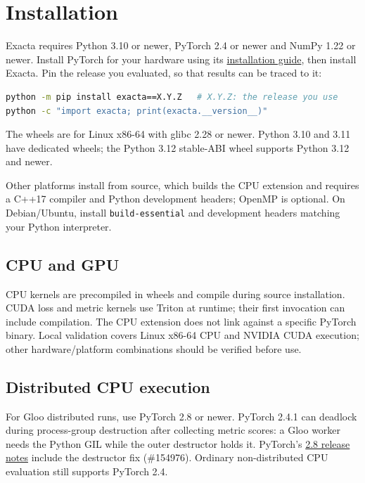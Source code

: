 \chapter{Installation}\label{ch:installation}

Exacta requires Python 3.10 or newer, PyTorch 2.4 or newer and NumPy 1.22 or newer.
Install PyTorch for your hardware using its \href{https://pytorch.org/get-started/locally/}{installation guide},
then install Exacta. Pin the release you evaluated, so that results can be traced to it:

\begin{lstlisting}[language=bash]
python -m pip install exacta==X.Y.Z   # X.Y.Z: the release you use
python -c "import exacta; print(exacta.__version__)"
\end{lstlisting}

The wheels are for Linux x86-64 with glibc 2.28 or newer. Python 3.10 and 3.11
have dedicated wheels; the Python 3.12 stable-ABI wheel supports Python 3.12 and newer.

Other platforms install from source, which builds the CPU extension and requires a C++17
compiler and Python development headers; OpenMP is optional. On Debian/Ubuntu, install
\texttt{build-essential} and development headers matching your Python interpreter.

\section{CPU and GPU}\label{installation:cpu-and-gpu}

CPU kernels are precompiled in wheels and compile during source installation. CUDA loss and
metric kernels use Triton at runtime; their first invocation can include compilation. The CPU extension does not link against a
specific PyTorch binary. Local validation covers Linux x86-64 CPU and NVIDIA CUDA execution;
other hardware/platform combinations should be verified before use.

\section{Distributed CPU execution}\label{installation:distributed-cpu-execution}

For Gloo distributed runs, use PyTorch 2.8 or newer. PyTorch 2.4.1 can deadlock during
process-group destruction after collecting metric scores: a Gloo worker needs the Python
GIL while the outer destructor holds it. PyTorch's \href{https://github.com/pytorch/pytorch/releases/tag/v2.8.0}{2.8 release notes}
include the destructor fix (\#154976). Ordinary non-distributed CPU evaluation still supports
PyTorch 2.4.

